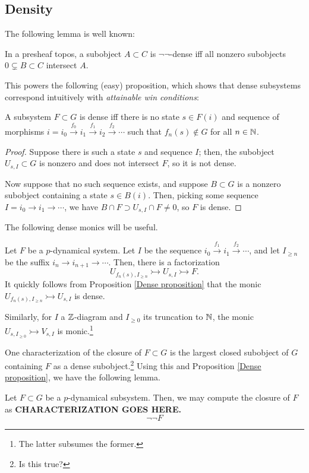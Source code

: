 \documentclass{amsart}
\begin{document}
\subsection{Density}
The following lemma is well known:
\begin{lemma}
  In a presheaf topos, a subobject $A \subset C$ is $\neg\neg$-dense iff all nonzero subobjects $0 \subsetneq B \subset C$ intersect $A$.
\end{lemma}
This powers the following (easy) proposition, which shows that dense subsystems correspond intuitively with \emph{attainable win conditions}:
\begin{proposition}\label{Dense proposition}
  A subsystem $F \subset G$ is dense iff there is no state $s \in F(i)$ and sequence of morphisms $i = i_0 \xrightarrow{f_0} i_1 \xrightarrow{f_1} i_2 \xrightarrow{f_2} \cdots$ such that $f_n(s) \not \in G$ for all $n \in \mathbb{N}$. 
\end{proposition}
\begin{proof}
  Suppose there is such a state $s$ and sequence $I$;
  then, the subobject $U_{s,I} \subset G$ is nonzero and does not intersect $F$, so it is not dense.

  Now suppose that no such sequence exists, and suppose $B \subset G$ is a nonzero subobject containing a state $s \in B(i)$.
  Then, picking some sequence $I = i_0 \rightarrow i_1 \rightarrow \cdots$, we have $B \cap F \supset U_{s,I} \cap F \neq 0$, so $F$ is dense.
\end{proof}

The following dense monics will be useful.
\begin{example}
  Let $F$ be a $p$-dynamical system.
  Let $I$ be the sequence $i_0 \xrightarrow{f_1} i_1 \xrightarrow{f_2} \cdots$, and let $I_{\geq n}$ be the suffix $i_n \rightarrow i_{n+1} \rightarrow \cdots$.
  Then, there is a factorization
  \[
      U_{f_n(s),I_{\geq n}} \rightarrowtail U_{s,I} \rightarrowtail F.
  \]
  It quickly follows from Proposition \ref{Dense proposition} that the monic $U_{f_n(s),I_{\geq n}} \rightarrowtail U_{s,I}$ is dense.

  Similarly, for $I$ a $\mathbb{Z}$-diagram and $I_{\geq 0}$ its truncation to $\mathbb{N}$, the monic $U_{s,I_{\geq 0}} \rightarrowtail V_{s,I}$ is monic.\footnote{\color{magenta} The latter subsumes the former.}
\end{example}

One characterization of the closure of $F\subset G$ is the largest closed subobject of $G$ containing $F$ as a dense subobject.\footnote{\color{magenta} Is this true?}
Using this and Proposition \ref{Dense proposition}, we have the following lemma.
\begin{lemma}
  Let $F \subset G$ be a $p$-dynamical subsystem.
  Then, we may compute the closure of $F$ as \textbf{CHARACTERIZATION GOES HERE.} 
  \[
    \neg \neg F
  \]
\end{lemma}
\end{document}
